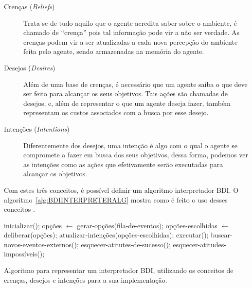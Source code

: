 \begin{description}
    \item [Crenças (\textit{Beliefs})]
        Trata-se de tudo aquilo que o agente acredita saber sobre o ambiente,
        é chamado de ``crença'' pois tal informação pode vir a não ser verdade.
        As crenças podem vir a ser atualizadas a cada nova percepção do ambiente
        feita pelo agente, sendo armazenadas na memória do agente.
    \item [Desejos (\textit{Desires})]
        Além de uma base de crenças, é necessário que um agente saiba o que deve
        ser feito para alcançar os seus objetivos. Tais ações são chamadas de
        desejos, e, além de representar o que um agente deseja fazer, também
        representam os custos associados com a busca por esse desejo.
    \item [Intenções (\textit{Intentions})]
        Diferentemente dos desejos, uma intenção é algo com o qual o agente se
        compromete a fazer em busca dos seus objetivos, dessa forma, podemos ver
        as intenções como as ações que efetivamente serão executadas para
        alcançar os objetivos.
\end{description}

Com estes três conceitos, é possível definir um algoritmo interpretador
BDI. O algoritmo~\ref{alg:BDIINTERPRETERALG} mostra como é feito o uso desses
conceitos \cite{BDIFROMTHEORYTOPRACTICE}.

\begin{algorithm}[htb]
\begin{center}
    \begin{algorithmic}[1]
        \STATE inicializar();
        \STATE
            \STATE opções $\gets$ gerar-opções(fila-de-eventos);
            \STATE opções-escolhidas $\gets$ deliberar(opções);
            \STATE atualizar-intenções(opções-escolhidas);
            \STATE executar();
            \STATE buscar-novos-eventos-externos();
            \STATE esquecer-atitutes-de-sucesso();
            \STATE esquecer-atitudes-impossíveis();
        \ENDWHILE
    \end{algorithmic}
\end{center}
\caption[Algoritmo para representar um interpretador BDI.]
    {\label{alg:BDIINTERPRETERALG}
        Algoritmo para representar um interpretador BDI, utilizando os conceitos
        de crenças, desejos e intenções para a sua implementação.}
\end{algorithm}

